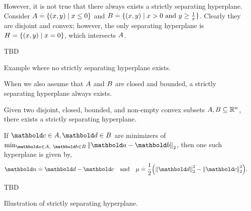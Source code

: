 However, it is not true that there always exists a strictly separating hyperplane. Consider $A \overset{.}{=} \{(x,y) \mid x \leq 0\}$ and $B \overset{.}{=} \{(x,y) \mid x > 0 \text{ and } y \geq \frac{1}{x}\}$. Clearly they are disjoint and convex; however, the only separating hyperplane is $H = \{(x,y) \mid x = 0\}$, which intersects $A$.
\begin{marginfigure}
TBD
\caption{Example where no strictly separating hyperplane exists.}
\end{marginfigure}

When we also assume that $A$ and $B$ are closed and bounded, a strictly separating hyperplane always exists.

\begin{thm} Given two disjoint, closed, bounded, and non-empty convex subsets $A, B \subseteq \mathbb{R}^n$, there exists a strictly separating hyperplane.

If $\vc \in \sA, \vd \in \sB$ are minimizers of $\min_{\va \in \sA,\ \vb \in \sB} \norm{\va - \vb}_2$, then one such hyperplane is given by, \begin{align}
    \vn \defeq \vd - \vc \quad\text{and}\quad \mu \defeq \frac{1}{2}\parentheses*{\norm{\vd}_2^2 - \norm{\vc}_2^2}.
\end{align}
\begin{marginfigure}
TBD
\caption{Illustration of strictly separating hyperplane.}
\end{marginfigure}
\end{thm}
